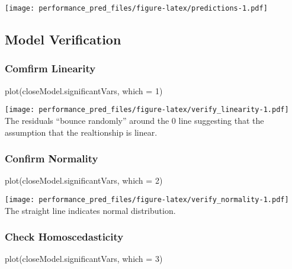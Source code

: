 \documentclass[
]{article}
\newenvironment{Shaded}{\begin{snugshade}}{\end{snugshade}}
\newcommand{\AttributeTok}[1]{\textcolor[rgb]{0.77,0.63,0.00}{#1}}
\newcommand{\DecValTok}[1]{\textcolor[rgb]{0.00,0.00,0.81}{#1}}
\newcommand{\FunctionTok}[1]{\textcolor[rgb]{0.00,0.00,0.00}{#1}}
\newcommand{\NormalTok}[1]{#1}
\begin{document}
\texttt{[image: performance\_pred\_files/figure-latex/predictions-1.pdf]}

\hypertarget{model-verification}{%
\subsection{Model Verification}\label{model-verification}}

\hypertarget{comfirm-linearity}{%
\subsubsection{Comfirm Linearity}\label{comfirm-linearity}}

\begin{Shaded}
\begin{Highlighting}[]
\FunctionTok{plot}\NormalTok{(closeModel.significantVars, }\AttributeTok{which =} \DecValTok{1}\NormalTok{)}
\end{Highlighting}
\end{Shaded}

\texttt{[image: performance\_pred\_files/figure-latex/verify\_linearity-1.pdf]}
The residuals ``bounce randomly'' around the 0 line suggesting that the
assumption that the realtionship is linear.

\hypertarget{confirm-normality}{%
\subsubsection{Confirm Normality}\label{confirm-normality}}

\begin{Shaded}
\begin{Highlighting}[]
\FunctionTok{plot}\NormalTok{(closeModel.significantVars, }\AttributeTok{which =} \DecValTok{2}\NormalTok{)}
\end{Highlighting}
\end{Shaded}

\texttt{[image: performance\_pred\_files/figure-latex/verify\_normality-1.pdf]}
The straight line indicates normal distribution.

\hypertarget{check-homoscedasticity}{%
\subsubsection{Check Homoscedasticity}\label{check-homoscedasticity}}

\begin{Shaded}
\begin{Highlighting}[]
\FunctionTok{plot}\NormalTok{(closeModel.significantVars, }\AttributeTok{which =} \DecValTok{3}\NormalTok{)}
\end{Highlighting}
\end{Shaded}
\end{document}
